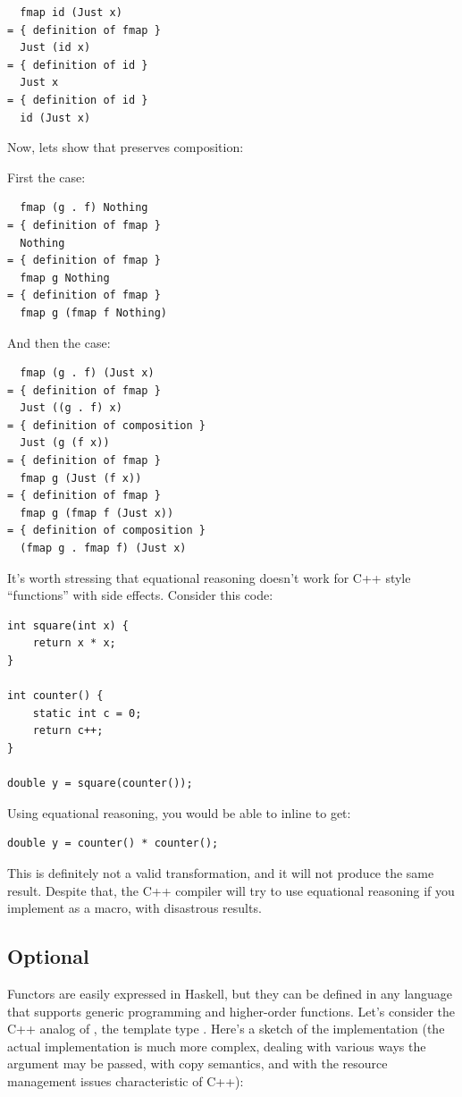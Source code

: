 \begin{Verbatim}
  fmap id (Just x)
= { definition of fmap }
  Just (id x)
= { definition of id }
  Just x
= { definition of id }
  id (Just x)
\end{Verbatim}
Now, lets show that  preserves composition:

First the  case:

\begin{Verbatim}
  fmap (g . f) Nothing
= { definition of fmap }
  Nothing
= { definition of fmap }
  fmap g Nothing
= { definition of fmap }
  fmap g (fmap f Nothing)
\end{Verbatim}
And then the  case:

\begin{Verbatim}
  fmap (g . f) (Just x)
= { definition of fmap }
  Just ((g . f) x)
= { definition of composition }
  Just (g (f x))
= { definition of fmap }
  fmap g (Just (f x))
= { definition of fmap }
  fmap g (fmap f (Just x))
= { definition of composition }
  (fmap g . fmap f) (Just x)
\end{Verbatim}
It's worth stressing that equational reasoning doesn't work for C++
style ``functions'' with side effects. Consider this code:

\begin{Verbatim}
int square(int x) { 
    return x * x;
}

int counter() { 
    static int c = 0;
    return c++;
}

double y = square(counter());
\end{Verbatim}
Using equational reasoning, you would be able to inline 
to get:

\begin{Verbatim}
double y = counter() * counter();
\end{Verbatim}
This is definitely not a valid transformation, and it will not produce
the same result. Despite that, the C++ compiler will try to use
equational reasoning if you implement  as a macro, with
disastrous results.

\subsection{Optional}

Functors are easily expressed in Haskell, but they can be defined in any
language that supports generic programming and higher-order functions.
Let's consider the C++ analog of , the template type
. Here's a sketch of the implementation (the actual
implementation is much more complex, dealing with various ways the
argument may be passed, with copy semantics, and with the resource
management issues characteristic of C++):

